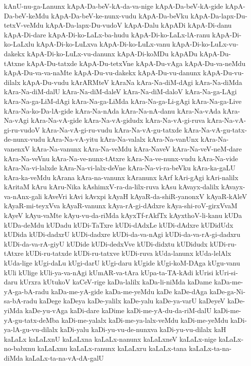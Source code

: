 {kAnU-nu-ga-Lanunx
kApA-Da-beV-kA-da-va-nige
kApA-Da-beV-kA-gide
kApA-Da-beV-keMdu
kApA-Da-beV-ke-nunx-vudu
kApA-Da-beVku
kApA-Da-lapx-Du-tetxV-veMdu
kApA-Da-lapx-Du-vudoV
kApA-Dalu
kApADi
kApA-Di-danu
kApA-Di-dare
kApA-Di-ko-LaLx-ba-hudu
kApA-Di-ko-LaLx-lA-ranu
kApA-Di-ko-LaLxlu
kApA-Di-ko-LuLxva
kApA-Di-ko-LuLx-vanu
kApA-Di-ko-LuLx-vu-dakekx
kApA-Di-ko-LuLx-vu-danunx
kApA-Di-koMDu
kApADu
kApA-Du-tAtxne
kApA-Du-tatxde
kApA-Du-tetxVne
kApA-Du-vAga
kApA-Du-va-neMdu
kApA-Du-va-va-naMte
kApA-Du-vu-dakekx
kApA-Du-vu-danunx
kApA-Du-vu-dilalx
kApA-Du-vudu
kArARMteV
kAraNa
kAra-Na-diM-dAgi
kAra-Na-diMda
kAra-Na-diM-dalU
kAra-Na-diM-daleV
kAra-Na-diM-daloV
kAra-Na-ga-LAgi
kAra-Na-ga-LiM-dAgi
kAra-Na-ga-LiMda
kAra-Na-ga-Li-gAgi
kAra-Na-ga-Live
kAra-Na-ko-Da-lA-gide
kAra-Na-nAda
kAra-Na-nA-danu
kAra-Na-vAda
kAra-Na-vAgi
kAra-Na-vA-gide
kAra-Na-vA-gidudx
kAra-Na-vA-gi-ruva
kAra-Na-vA-gi-ru-vudoV
kAra-Na-vA-gi-ru-vudu
kAra-Na-vA-gu-tatxde
kAra-Na-vA-gu-tatx-de-nunx-vudu
kAra-Na-vA-yitu
kAra-Na-valalx
kAra-Na-vanUnx
kAra-Na-vanenxV
kAra-Na-vanunx
kAra-Na-veMdu
kAra-NaveV
kAra-Na-veV-neM-dare
kAra-Na-veVnu
kAra-Na-ve-nunx-tAtxre
kAra-Na-ve-nunx-vudu
kAra-Na-vide
kAra-Na-vi-lalxde
kAra-Na-vi-lalx-deVne
kAra-Na-vi-ra-beVku
kAra-ka-gaLU
kAra-ka-veMdu
kArana
kAra-na-vanunx
kAranunx
kArf
kAri-gAgi
kAri-nalilx
kAritaM
kAru
kAru-Nika
kAshimxV-ra-da-lilx-ruva
kAsu
kAvayx-dalilx
kAvayx-va-nAnx-gali
kAveVri
kAvi
kAvxpi
kAyaH
kAyaR-da-shiR-yanonxV
kAyaR-kAleV
kAyaR-mi-teyxVva
kAyaR-vanunx
kAya-rA-gi-dAdxre
kAya-shi-roV-girxVvaM
kAyeV
kAyu-vaMte
kAyu-vu-da-riMda
kAyxTf-rAkfTx
kAyxthoV-li-kanu
kUDa
kUDa-deMdu
kUDadu
kUDi-TaTxre
kUDi-dAdxLe
kUDi-dAdxre
kUDidUdx
kUDida
kUDi-dadxrU
kUDi-dadxre
kUDi-da-va-nAgi
kUDi-da-va-rA-gi-dadxru
kUDi-da-va-rA-giyU
kUDide
kUDi-dedxVve
kUDi-didxtu
kUDidudx
kUDi-ru-tAtxre
kUDi-ru-tatxde
kUDi-ru-tatxve
kUDi-ruva
kUda-lanunx
kUda-lelAlx
kUda-lige
kUgi-daLu
kUgi-darU
kUgi-daru
kUgide
kUgi-koM-DAga
kUgu-vanu
kUli
kUlige
kUli-ya-va-nAgi
kUmAR-va-tAra
kUpa-ta-TA-kAdi
kUrisi
kUri-si-daru
kUrxra
kUtukoV
kaCeV-rige
kaDa-lalilx
kaDa-li-niMda
kaDame
kaDa-me-yA-ga-bA-radu
kaDa-me-yA-gide
kaDa-me-yeMdu
kaDe
kaDe-dAga
kaDe-ga-Ni-sa-bA-radu
kaDege
kaDeya
kaDe-yalilx
kaDe-yalu
kaDe-ya-varU
kaDeyeV
kaDe-yiMda
kaDe-yu-vAga
kaDi-dare
kaDime
kaDi-me-yA-du-da-riM-dalU
kaDi-me-yA-gu-tatx-deMba
kaDi-me-yalalx
kaDi-me-ya-lalx-veMdu
kaDi-me-yeMdu
kaDi-ya-lA-gu-vu-dilalx
kaDi-yalu
kaDi-yu-vu-de-nunxva
kaDi-yu-vu-dilalx
kaH
kaLaLx
kaLaLxnU
kaLaLxna
kaLaLx-nanunx
kaLaLxneV
kaLaLx-nige
kaLaLx-no-babxnu
kaLaLxnu
kaLaLx-ranunx
kaLaLxru
kaLaLx-tana
kaLaLx-ta-na-diMda
kaLaLx-ta-na-vA-dA-galU
}
